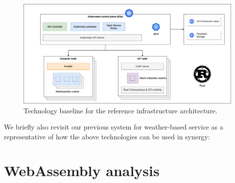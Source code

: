 \begin{figure}[ht]
\centering
\includegraphics[width=\columnwidth]{figures/architecture-technologies}
\caption{Technology baseline for the reference infrastructure architecture.} \label{fig:architecture-technologies}
\end{figure}

We briefly also revisit our previous system for weather-based service as a representative of how the above technologies can be used in synergy:


\section{WebAssembly analysis}\label{sec:wasm}

